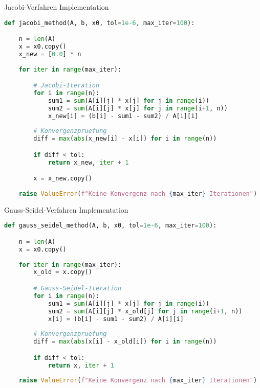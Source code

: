 \begin{examplecode}{Jacobi-Verfahren Implementation}
\begin{lstlisting}[language=Python, style=basesmol]
def jacobi_method(A, b, x0, tol=1e-6, max_iter=100):

    n = len(A)
    x = x0.copy()
    x_new = [0.0] * n
    
    for iter in range(max_iter):

        # Jacobi-Iteration
        for i in range(n):
            sum1 = sum(A[i][j] * x[j] for j in range(i))
            sum2 = sum(A[i][j] * x[j] for j in range(i+1, n))
            x_new[i] = (b[i] - sum1 - sum2) / A[i][i]
            
        # Konvergenzpruefung
        diff = max(abs(x_new[i] - x[i]) for i in range(n))

        if diff < tol:
            return x_new, iter + 1

        x = x_new.copy()
        
    raise ValueError(f"Keine Konvergenz nach {max_iter} Iterationen")
\end{lstlisting}
\end{examplecode}



\begin{examplecode}{Gauss-Seidel-Verfahren Implementation}
\begin{lstlisting}[language=Python, style=basesmol]
def gauss_seidel_method(A, b, x0, tol=1e-6, max_iter=100):

    n = len(A)
    x = x0.copy()
    
    for iter in range(max_iter):
        x_old = x.copy()

        # Gauss-Seidel-Iteration
        for i in range(n):
            sum1 = sum(A[i][j] * x[j] for j in range(i))
            sum2 = sum(A[i][j] * x_old[j] for j in range(i+1, n))
            x[i] = (b[i] - sum1 - sum2) / A[i][i]
            
        # Konvergenzpruefung
        diff = max(abs(x[i] - x_old[i]) for i in range(n))

        if diff < tol:
            return x, iter + 1
            
    raise ValueError(f"Keine Konvergenz nach {max_iter} Iterationen")
\end{lstlisting}
\end{examplecode}


